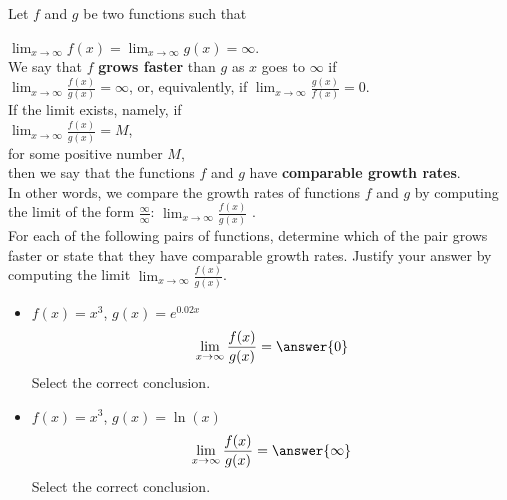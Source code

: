 \documentclass{ximera}
\author{Nela Lakos \and Kyle Parsons}
\begin{document}
\begin{exercise}
Let $f$ and $g$ be two functions such that

$\lim_{x\to\infty}f(x)=\lim_{x\to\infty}g(x)=\infty$.\\



We say that $f$   \textbf{grows faster} than $g$ as $x$ goes to $\infty$  if\\

$\lim_{x\to\infty}\frac{f(x)}{g(x)}=\infty$, or, equivalently, if $\lim_{x\to\infty}\frac{g(x)}{f(x)}=0$.\\

If the limit exists, namely, if\\

$\lim_{x\to\infty}\frac{f(x)}{g(x)}=M$, \\


for some positive number $M$,\\

 then we say that the functions $f$ and $g$ have \textbf{comparable growth rates}.\\



In other words, we compare the growth rates of  functions $f$ and $g$ by computing the limit of the form $\frac{\infty}{\infty}$: $\lim_{x\to\infty}\frac{f(x)}{g(x)}$ .\\




For each of the following pairs of functions, determine which of the pair grows faster or state that they have comparable growth rates.  Justify your answer by computing the limit $\lim_{x\to\infty}\frac{f(x)}{g(x)}$.

\begin{itemize}

\item $f(x)=x^3$, $g(x)=e^{0.02x}$
\[
\lim_{x\to\infty}\frac{f(x)}{g(x)} = \answer{0}
\]
Select the correct conclusion.
\begin{multipleChoice}
\end{multipleChoice}

\item $f(x)=x^3$, $g(x)=\ln(x)$
\[
\lim_{x\to\infty}\frac{f(x)}{g(x)} = \answer{\infty}
\]
Select the correct conclusion.
\begin{multipleChoice}
\end{multipleChoice}


\end{itemize}
\end{exercise}
\end{document}
